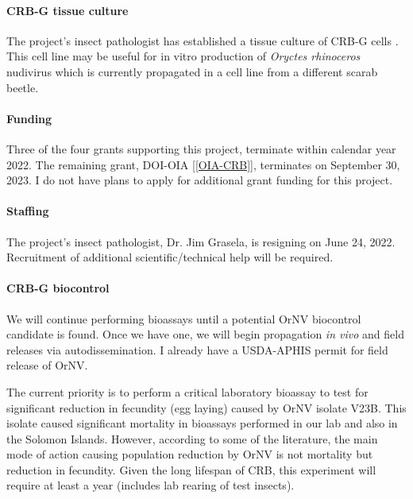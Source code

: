 \begin{refsection}
\paragraph{CRB-G tissue culture}
The project's insect pathologist has established a tissue culture of CRB-G cells \cite{grasela_preliminary_2022}.
This cell line may be useful for in vitro production of \textit{Oryctes rhinoceros} nudivirus which is currently propagated in a cell line from a different scarab beetle.

\paragraph{Funding} 

Three of the four grants supporting this project, terminate within calendar year 2022. The remaining grant, DOI-OIA [\ref{OIA-CRB}], terminates on September 30, 2023. I do not have plans to apply for additional grant funding for this project.

\paragraph{Staffing}

The project's insect pathologist, Dr. Jim Grasela, is resigning on June 24, 2022. Recruitment of additional scientific/technical help will be required.

\paragraph{CRB-G biocontrol} 

We will continue performing bioassays until a potential OrNV biocontrol candidate is found. Once we have one, we will begin propagation \textit{in vivo} and field releases via autodissemination. I already have a USDA-APHIS permit for field release of OrNV.

The current priority is to perform a critical laboratory bioassay to test for significant reduction in fecundity (egg laying) caused by OrNV isolate V23B. This isolate caused significant mortality in bioassays performed in our lab and also in the Solomon Islands. However, according to some of the literature, the main mode of action causing population reduction by OrNV is not mortality but reduction in fecundity. Given the long lifespan of CRB, this experiment will require at least a year (includes lab rearing of test insects).


\end{refsection}
